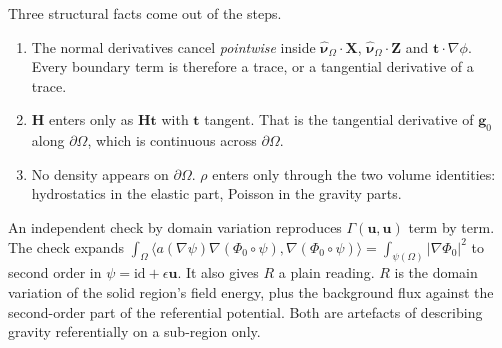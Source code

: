 \documentclass[11pt]{article}
\theoremstyle{definition}
\theoremstyle{remark}
\newcommand{\bu}{\mathbf{u}}
\newcommand{\nuho}{\hat{\boldsymbol{\nu}}_\Omega}
\begin{document}
Three structural facts come out of the steps.
\begin{enumerate}
\item The normal derivatives cancel \emph{pointwise} inside $\nuho\cdot\mathbf X$, $\nuho\cdot\mathbf Z$ and $\mathbf t\cdot
  \nabla\phi$. Every boundary term is therefore a trace, or a
  tangential derivative of a trace.
\item $\mathbf H$ enters only as $\mathbf H\mathbf t$ with $\mathbf t$
  tangent. That is the tangential derivative of $\mathbf g_0$ along
  $\partial\Omega$, which is continuous across $\partial\Omega$.
\item No density appears on $\partial\Omega$. $\rho$ enters only
  through the two volume identities: hydrostatics in the elastic part,
  Poisson in the gravity parts.
\end{enumerate}

An independent check by domain variation reproduces $\Gamma(\bu, \bu)$
term by term. The check expands $\int_\Omega\langle a(\nabla\psi)
\nabla(\Phi_0\circ\psi), \nabla(\Phi_0\circ\psi)\rangle =
\int_{\psi(\Omega)}|\nabla\Phi_0|^2$ to second order in $\psi =
\mathrm{id} + \epsilon\bu$. It also gives $R$ a plain reading. $R$ is
the domain variation of the solid region's field energy, plus the
background flux against the second-order part of the referential
potential. Both are artefacts of describing gravity referentially on a
sub-region only.
\end{document}
